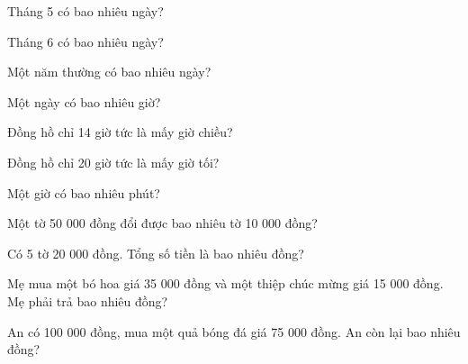 \begin{ex}
Tháng 5 có bao nhiêu ngày?
\end{ex}

\begin{ex}
Tháng 6 có bao nhiêu ngày?
\end{ex}

\begin{ex}
Một năm thường có bao nhiêu ngày?
\end{ex}

\begin{ex}
Một ngày có bao nhiêu giờ?
\end{ex}

\begin{ex}
Đồng hồ chỉ 14 giờ tức là mấy giờ chiều?
\end{ex}

\begin{ex}
Đồng hồ chỉ 20 giờ tức là mấy giờ tối?
\end{ex}

\begin{ex}
Một giờ có bao nhiêu phút?
\end{ex}

\begin{ex}
Một tờ 50 000 đồng đổi được bao nhiêu tờ 10 000 đồng?
\end{ex}

\begin{ex}
Có 5 tờ 20 000 đồng. Tổng số tiền là bao nhiêu đồng?
\end{ex}

\begin{ex}
Mẹ mua một bó hoa giá 35 000 đồng và một thiệp chúc mừng giá 15 000 đồng. Mẹ phải trả bao nhiêu đồng?
\end{ex}

\begin{ex}
An có 100 000 đồng, mua một quả bóng đá giá 75 000 đồng. An còn lại bao nhiêu đồng?
\end{ex}

